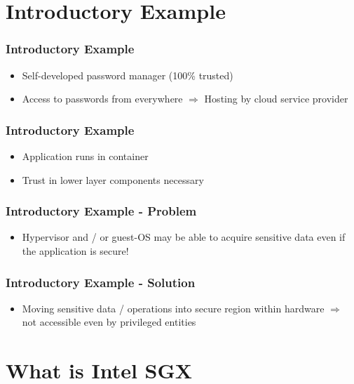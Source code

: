 \section{Introductory Example}
\begin{frame}
    \frametitle{Introductory Example}
    \begin{itemize}
        \item Self-developed password manager (100\% trusted)
        \item Access to passwords from everywhere \newline$ \Rightarrow$ Hosting by cloud service provider
    \end{itemize}
    \centering
\end{frame}

\begin{frame}
    \frametitle{Introductory Example}
    \begin{itemize}
        \item Application runs in container
        \item Trust in lower layer components necessary
    \end{itemize}
    \centering
\end{frame}

\begin{frame}
    \frametitle{Introductory Example - Problem}
    \begin{itemize}
        \item Hypervisor and / or guest-OS may be able to acquire sensitive data even if the application is secure!
    \end{itemize}
    \centering
\end{frame}

\begin{frame}
    \frametitle{Introductory Example - Solution}
    \begin{itemize}
        \item Moving sensitive data / operations into secure region within hardware \newline $\Rightarrow$ not accessible even by privileged entities
    \end{itemize}
    \centering
\end{frame}

\section{What is Intel SGX}

